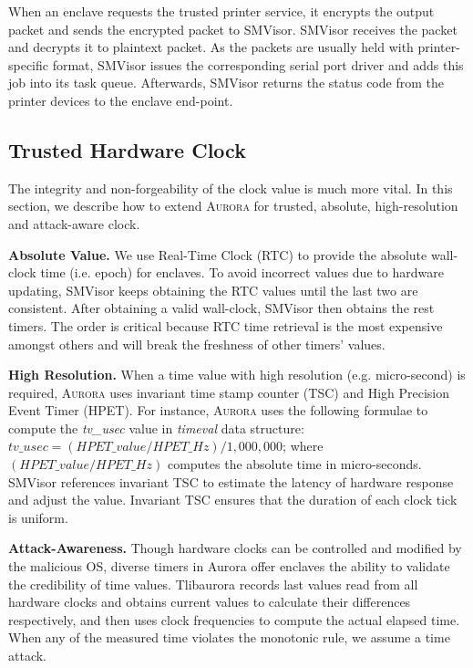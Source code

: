 \documentclass[journal,twocolumn,letterpaper,10pt]{IEEEtran}
\begin{document}
When an enclave requests the trusted printer service, it encrypts the output packet and sends the encrypted packet to SMVisor.  SMVisor receives the packet and decrypts it to plaintext packet. As the packets are usually held with printer-specific format, SMVisor issues the corresponding serial port driver and adds this job into its task queue. Afterwards, SMVisor returns the status code from the printer devices to the enclave end-point.

\subsection{Trusted Hardware Clock}\label{time service}
The integrity and non-forgeability of the clock value is much more vital. In this section, we describe how to extend \textsc{Aurora} for trusted, absolute, high-resolution and attack-aware clock.


\textbf{Absolute Value.}
We use Real-Time Clock (RTC) to provide the absolute wall-clock time (i.e. epoch) for enclaves. To avoid incorrect values due to hardware updating, SMVisor keeps obtaining the RTC values until the last two are consistent. After obtaining a valid wall-clock, SMVisor then obtains the rest timers. The order is critical because RTC time retrieval is the most expensive amongst others and will break the freshness of other timers' values.

\textbf{High Resolution.}
When a time value with high resolution (e.g. micro-second) is required, \textsc{Aurora} uses invariant time stamp counter (TSC) and High Precision Event Timer (HPET). For instance, \textsc{Aurora} uses the following formulae to compute the \textit{tv\_usec} value in \textit{timeval} data structure: {$tv\_usec = (HPET\_value/ HPET\_Hz) / 1,000,000$;} where $(HPET\_value / HPET\_Hz)$ computes the absolute time in micro-seconds. SMVisor references invariant TSC to estimate the latency of hardware response and adjust the value. Invariant TSC ensures that the duration of each clock tick is uniform. 

\textbf{Attack-Awareness.}
Though hardware clocks can be controlled and modified by the malicious OS, diverse timers in Aurora offer enclaves the ability to validate the credibility of time values. Tlibaurora records last values read from all hardware clocks and obtains current values to calculate their differences respectively, and then uses clock frequencies to compute the actual elapsed time. When any of the measured time violates the monotonic rule, we assume a time attack.
\end{document}
